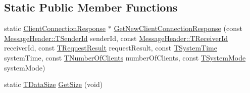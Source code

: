 \subsection*{Static Public Member Functions}
\begin{DoxyCompactItemize}
\item 
static \hyperlink{class_terra_swarm_1_1_synchronous_1_1_client_connection_response}{Client\-Connection\-Response} $\ast$ \hyperlink{class_terra_swarm_1_1_synchronous_1_1_client_connection_response_ae38339e5fc2703a0ddb58da353722ea8}{Get\-New\-Client\-Connection\-Response} (const \hyperlink{class_terra_swarm_1_1_message_header_a516b36855e2aad7cfbf8770f1b42784f}{Message\-Header\-::\-T\-Sender\-Id} sender\-Id, const \hyperlink{class_terra_swarm_1_1_message_header_aa3260702b182b6f88ddbdd3416e98df0}{Message\-Header\-::\-T\-Receiver\-Id} receiver\-Id, const \hyperlink{class_terra_swarm_1_1_synchronous_1_1_client_connection_response_a4b55c1f852e288564e5aa00e882f80d5}{T\-Request\-Result} request\-Result, const \hyperlink{class_terra_swarm_1_1_synchronous_1_1_client_connection_response_a7b389f7e89631ce7c758c3a26c46c303}{T\-System\-Time} system\-Time, const \hyperlink{class_terra_swarm_1_1_synchronous_1_1_client_connection_response_adc391c9557f0acfdb0763043058cdf83}{T\-Number\-Of\-Clients} number\-Of\-Clients, const \hyperlink{class_terra_swarm_1_1_synchronous_1_1_client_connection_response_a828bc4f350b4f661c541d988c79f05e9}{T\-System\-Mode} system\-Mode)
\item 
static \hyperlink{namespace_terra_swarm_a092e6ec9739175076ae3106783f5c1b6}{T\-Data\-Size} \hyperlink{class_terra_swarm_1_1_synchronous_1_1_client_connection_response_af665b5c5ef472eddc40f46ad185b2d90}{Get\-Size} (void)
\end{DoxyCompactItemize}
